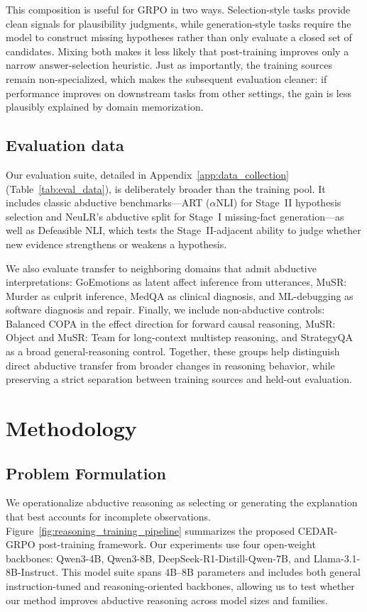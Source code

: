 \documentclass[11pt]{article}
\begin{document}
This composition is useful for GRPO in two ways. Selection-style tasks provide clean signals for plausibility judgments, while generation-style tasks require the model to construct missing hypotheses rather than only evaluate a closed set of candidates. Mixing both makes it less likely that post-training improves only a narrow answer-selection heuristic. Just as importantly, the training sources remain non-specialized, which makes the subsequent evaluation cleaner: if performance improves on downstream tasks from other settings, the gain is less plausibly explained by domain memorization.

\subsection{Evaluation data}

Our evaluation suite, detailed in Appendix~\ref{app:data_collection} (Table~\ref{tab:eval_data}), is deliberately broader than the training pool. It includes classic abductive benchmarks---ART ($\alpha$NLI) for Stage~II hypothesis selection and NeuLR's abductive split for Stage~I missing-fact generation---as well as Defeasible NLI, which tests the Stage~II-adjacent ability to judge whether new evidence strengthens or weakens a hypothesis.

We also evaluate transfer to neighboring domains that admit abductive interpretations: GoEmotions as latent affect inference from utterances, MuSR: Murder as culprit inference, MedQA as clinical diagnosis, and ML-debugging as software diagnosis and repair. Finally, we include non-abductive controls: Balanced COPA in the effect direction for forward causal reasoning, MuSR: Object and MuSR: Team for long-context multistep reasoning, and StrategyQA as a broad general-reasoning control. Together, these groups help distinguish direct abductive transfer from broader changes in reasoning behavior, while preserving a strict separation between training sources and held-out evaluation.


\section{Methodology}

\subsection{Problem Formulation}

We operationalize abductive reasoning as selecting or generating the explanation that best accounts for incomplete observations. Figure~\ref{fig:reasoning_training_pipeline} summarizes the proposed CEDAR-GRPO post-training framework. Our experiments use four open-weight backbones: Qwen3-4B, Qwen3-8B, DeepSeek-R1-Distill-Qwen-7B, and Llama-3.1-8B-Instruct. This model suite spans 4B--8B parameters and includes both general instruction-tuned and reasoning-oriented backbones, allowing us to test whether our method improves abductive reasoning across model sizes and families.
\end{document}
